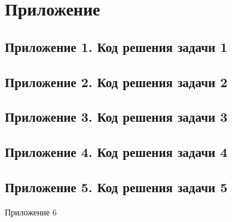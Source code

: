 \newpage
{}
\section{Приложение}

\RaggedLeft

\subsection*{Приложение 1. Код решения задачи 1}
\label{appendix:1}

\newpage
{}
\subsection*{Приложение 2. Код решения задачи 2}
\label{appendix:2}

\newpage
{}
\subsection*{Приложение 3. Код решения задачи 3}
\label{appendix:3}

\newpage
{}
\subsection*{Приложение 4. Код решения задачи 4}
\label{appendix:4}

\newpage
{}
\subsection*{Приложение 5. Код решения задачи 5}
\label{appendix:5}


\newpage
{}
Приложение 6
\label{appendix:6}

